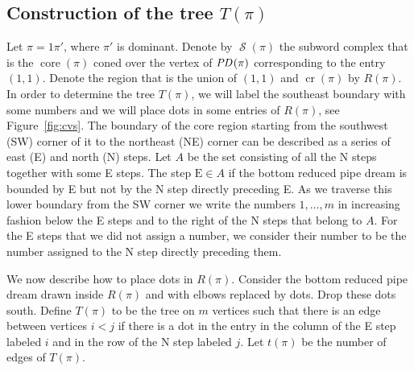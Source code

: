 \documentclass[ALCO,ThmDefs]{cedram}
\numberwithin{equation}{section}
\DeclareMathOperator{\core}{core}
\DeclareMathOperator{\rmcr}{cr}
\newcommand*\+{\smash{\lower2pt\hbox{\rlap{\vrule height14pt}}\raise2pt\hbox{\rlap{\hskip-3pt \vrule height.4pt depth0pt width14.7pt}}}}
\newcommand*{\MK}{\mkern 2mu}
\DeclareMathOperator{\PD}{\textit{PD}\MK}
\DeclareMathOperator{\Scal}{\mathcal{S}}
\begin{document}
\subsection{Construction of the tree \texorpdfstring{$T(\pi)$}{T(pi)}}

Let $\pi=1\pi'$, where $\pi'$ is dominant. Denote by $\Scal(\pi)$ the subword complex that is the $\core(\pi)$ coned over the vertex of $\PD(\pi)$ corresponding to the entry $(1,1)$. Denote the region that is the union of $(1,1)$ and $\rmcr(\pi)$ by $R(\pi)$. In order to determine the tree $T(\pi)$, we will label the southeast boundary with some numbers and we will place dots in some entries of $R(\pi)$, see Figure~\ref{fig:cvs}. The boundary of the core region starting from the southwest (SW) corner of it to the northeast (NE) corner can be described as a series of east (E) and north (N) steps. Let $A$ be the set consisting of all the N steps together with some E steps. The step $\text{E}\in A$ if the bottom reduced pipe dream is bounded by E but not by the N step directly preceding E. As we traverse this lower boundary from the SW corner we write the numbers $1,\dots, m$ in increasing fashion below the E steps and to the right of the N steps that belong to $A$. For the E steps that we did not assign a number, we consider their number to be the number assigned to the N step directly preceding them.

We now describe how to place dots in $R(\pi)$. Consider the bottom reduced pipe dream drawn inside $R(\pi)$ and with elbows replaced by dots. Drop these dots south. Define $T(\pi)$ to be the tree on $m$ vertices such that there is an edge between vertices $i<j$ if there is a dot in the entry in the column of the E step labeled $i$ and in the row of the N step labeled $j$. Let $t(\pi)$ be the number of edges of $T(\pi)$.
\end{document}
